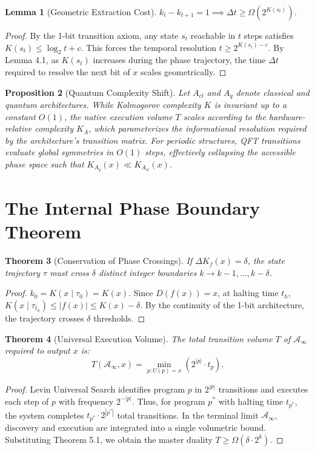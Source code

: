 \documentclass[12pt,a4paper]{article}
\theoremstyle{plain}
\newtheorem{theorem}{Theorem}[section]
\newtheorem{lemma}[theorem]{Lemma}
\newtheorem{proposition}[theorem]{Proposition}
\theoremstyle{definition}
\begin{document}
\begin{lemma}[Geometric Extraction Cost]
$k_t - k_{t+1} = 1 \implies \Delta t \ge \Omega(2^{K(s_t)})$.
\end{lemma}
\begin{proof}
By the 1-bit transition axiom, any state $s_t$ reachable in $t$ steps satisfies $K(s_t) \le \log_2 t + c$. This forces the temporal resolution $t \ge 2^{K(s_t) - c}$. By Lemma 4.1, as $K(s_t)$ increases during the phase trajectory, the time $\Delta t$ required to resolve the next bit of $x$ scales geometrically.
\end{proof}

\begin{proposition}[Quantum Complexity Shift]
Let $A_{cl}$ and $A_{q}$ denote classical and quantum architectures. While Kolmogorov complexity $K$ is invariant up to a constant $O(1)$, the native execution volume $T$ scales according to the hardware-relative complexity $K_A$, which parameterizes the informational resolution required by the architecture's transition matrix. For periodic structures, QFT transitions evaluate global symmetries in $O(1)$ steps, effectively collapsing the accessible phase space such that $K_{A_q}(x) \ll K_{A_{cl}}(x)$.
\end{proposition}

\section{The Internal Phase Boundary Theorem}

\begin{theorem}[Conservation of Phase Crossings]
If $\Delta K_f(x) = \delta$, the state trajectory $\tau$ must cross $\delta$ distinct integer boundaries $k \to k-1, \dots, k-\delta$.
\end{theorem}
\begin{proof}
$k_0 = K(x \mid \tau_0) = K(x)$. Since $D(f(x))=x$, at halting time $t_h$, $K(x \mid \tau_{t_h}) \le |f(x)| \le K(x) - \delta$. By the continuity of the 1-bit architecture, the trajectory crosses $\delta$ thresholds.
\end{proof}

\begin{theorem}[Universal Execution Volume]
The total transition volume $T$ of $\mathcal{A}_\infty$ required to output $x$ is:
\begin{equation}
T(\mathcal{A}_\infty, x) = \min_{p: U(p)=x} (2^{|p|} \cdot t_p).
\end{equation}
\end{theorem}
\begin{proof}
Levin Universal Search identifies program $p$ in $2^{|p|}$ transitions and executes each step of $p$ with frequency $2^{-|p|}$. Thus, for program $p^*$ with halting time $t_{p^*}$, the system completes $t_{p^*} \cdot 2^{|p^*|}$ total transitions. In the terminal limit $\mathcal{A}_\infty$, discovery and execution are integrated into a single volumetric bound. Substituting Theorem 5.1, we obtain the master duality $T \ge \Omega(\delta \cdot 2^k)$.
\end{proof}
\end{document}
